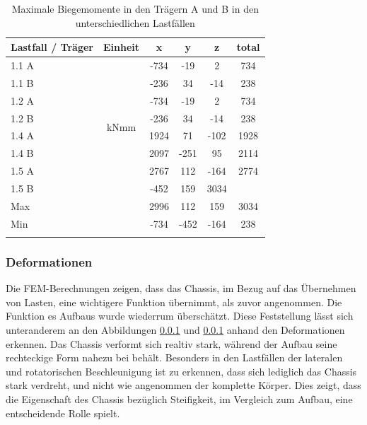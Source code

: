 \begin{table}[H]
\centering
\begin{tabular}{lccccc}
\thickhline
Lastfall / Träger	&	Einheit	&	x	&	y	&	z	&	total	\\	\hline
1.1 A	&	\multirow{8}{*}{kNmm}	&	-734	&	-19	&	2	&	734	\\
1.1 B	&		&	-236	&	34	&	-14	&	238	\\
1.2 A	&		&	-734	&	-19	&	2	&	734	\\
1.2 B	&		&	-236	&	34	&	-14	&	238	\\
1.4 A	&		&	1924	&	71	&	-102	&	1928	\\
1.4 B	&		&	2097	&	-251	&	95	&	2114	\\
1.5 A	&		&	2767	&	112	&	-164	&	2774	\\
1.5 B	&		0	2996	&	-452	&	159	&	3034	\\	\hline
Max	&		&	2996	&	112	&	159	&	3034	\\
Min	&		&	-734	&	-452	&	-164	&	238	\\	\thickhline
\end{tabular}
\caption{Maximale Biegemomente in den Trägern A und B in den unterschiedlichen Lastfällen}
\label{tab:FEMres Träger Moment}
\end{table}


\subsubsection{Deformationen}
Die FEM-Berechnungen zeigen, dass das Chassis, im Bezug auf das Übernehmen von Lasten, eine wichtigere Funktion übernimmt, als zuvor angenommen. Die Funktion es Aufbaus wurde wiederrum überschätzt. Diese Feststellung lässt sich unteranderem an den Abbildungen \ref{} und \ref{} anhand den Deformationen erkennen. Das Chassis verformt sich realtiv stark, während der Aufbau seine rechteckige Form nahezu bei behält. Besonders in den Lastfällen der lateralen und rotatorischen Beschleunigung ist zu erkennen, dass sich lediglich das Chassis stark verdreht, und nicht wie angenommen der komplette Körper. Dies zeigt, dass die Eigenschaft des Chassis bezüglich Steifigkeit, im Vergleich zum Aufbau, eine entscheidende Rolle spielt. \\

